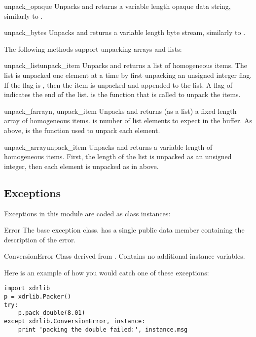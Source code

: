 \begin{methoddesc}[Unpacker]{unpack_opaque}{}
Unpacks and returns a variable length opaque data string, similarly to
.
\end{methoddesc}

\begin{methoddesc}[Unpacker]{unpack_bytes}{}
Unpacks and returns a variable length byte stream, similarly to
.
\end{methoddesc}

The following methods support unpacking arrays and lists:

\begin{methoddesc}[Unpacker]{unpack_list}{unpack_item}
Unpacks and returns a list of homogeneous items.  The list is unpacked
one element at a time
by first unpacking an unsigned integer flag.  If the flag is ,
then the item is unpacked and appended to the list.  A flag of
 indicates the end of the list.   is the
function that is called to unpack the items.
\end{methoddesc}

\begin{methoddesc}[Unpacker]{unpack_farray}{n, unpack_item}
Unpacks and returns (as a list) a fixed length array of homogeneous
items.   is number of list elements to expect in the buffer.
As above,  is the function used to unpack each element.
\end{methoddesc}

\begin{methoddesc}[Unpacker]{unpack_array}{unpack_item}
Unpacks and returns a variable length  of homogeneous items.
First, the length of the list is unpacked as an unsigned integer, then
each element is unpacked as in  above.
\end{methoddesc}


\subsection{Exceptions \label{xdr-exceptions}}

Exceptions in this module are coded as class instances:

\begin{excdesc}{Error}
The base exception class.   has a single public data
member  containing the description of the error.
\end{excdesc}

\begin{excdesc}{ConversionError}
Class derived from .  Contains no additional instance
variables.
\end{excdesc}

Here is an example of how you would catch one of these exceptions:

\begin{verbatim}
import xdrlib
p = xdrlib.Packer()
try:
    p.pack_double(8.01)
except xdrlib.ConversionError, instance:
    print 'packing the double failed:', instance.msg
\end{verbatim}
